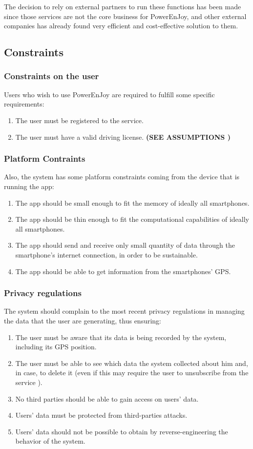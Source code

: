 \documentclass[11pt]{article} %
\newcommand{\pe}{PowerEnJoy }
\newcommand{\pecomma}{PowerEnJoy, }
\begin{document}
 The decision to rely on external partners to run these functions has been made since those services are not the core business for \pecomma and other external companies has already found very efficient and cost-effective solution to them.


\subsection{Constraints}
  
\subsubsection{Constraints on the user}
Users who wish to use \pe are required to fulfill some specific requirements:
\begin{enumerate}
	\item The user must be registered to the service.
	\item The user must have a valid driving license. \textbf{(SEE ASSUMPTIONS
)}
\end{enumerate}

\subsubsection{Platform Contraints}
Also, the system has some platform constraints coming from the device that is running the app:
\begin{enumerate}
	\item The app should be small enough to fit the memory of ideally all smartphones.
	\item The app should be thin enough to fit the computational capabilities of ideally all smartphones.
	\item The app should send and receive only small quantity of data through the smartphone's internet connection, in order to be sustainable.
	\item The app should be able to get information from the smartphones' GPS.
  \end{enumerate}

\subsubsection{Privacy regulations}
The system should complain to the most recent privacy regulations in managing the data that the user are generating, thus ensuring:
\begin{enumerate}
	\item The user must be aware that its data is being recorded by the system, including its GPS position.
	\item The user must be able to see which data the system collected about him and, in case, to delete it (even if this may require the user to unsubscribe from the service
).
	\item No third parties should be able to gain access on users' data.
	\item Users' data must be protected from third-parties attacks.
	\item Users' data should not be possible to obtain by reverse-engineering the behavior of the system.
\end{enumerate}
\end{document}
